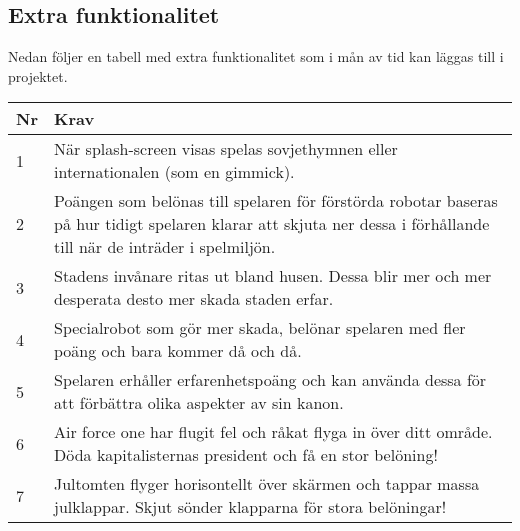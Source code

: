 \documentclass{TDP003mall}
\begin{document}
\subsection{Extra funktionalitet}
Nedan följer en tabell med extra funktionalitet som i mån av tid kan läggas till i projektet.
\begin{table}[!h]
\begin{tabularx}{\linewidth}{|l|X|}
\hline
Nr & Krav\\\hline
1 & När splash-screen visas spelas sovjethymnen eller internationalen (som en gimmick). \\\hline
2 & Poängen som belönas till spelaren för förstörda robotar baseras på hur tidigt spelaren klarar att skjuta ner dessa i förhållande till när de inträder i spelmiljön. \\\hline
3 & Stadens invånare ritas ut bland husen. Dessa blir mer och mer desperata desto mer skada staden erfar.\\\hline
4 & Specialrobot som gör mer skada, belönar spelaren med fler poäng och bara kommer då och då.\\\hline
5 & Spelaren erhåller erfarenhetspoäng och kan använda dessa för att förbättra olika aspekter av sin kanon.\\\hline
6 & Air force one har flugit fel och råkat flyga in över ditt område. Döda kapitalisternas president och få en stor belöning!\\\hline
7 & Jultomten flyger horisontellt över skärmen och tappar massa julklappar. Skjut sönder klapparna för stora belöningar!\\\hline
\end{tabularx}
\end{table}
\end{document}

